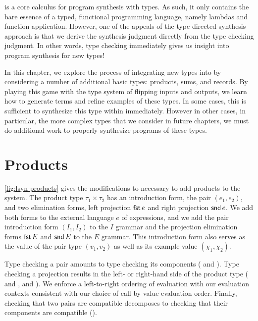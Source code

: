 \lsyn{} is a core calculus for program synthesis with types.
As such, it only contains the bare essence of a typed, functional programming language, namely lambdas and function application.
However, one of the appeals of the type-directed synthesis approach is that we derive the synthesis judgment directly from the type checking judgment.
In other words, type checking immediately gives us insight into program synthesis for new types!

In this chapter, we explore the process of integrating new types into \lsyn{} by considering a number of additional basic types: products, sums, and records.
By playing this game with the type system of flipping inputs and outputs, we learn how to generate terms and refine examples of these types.
In some cases, this is sufficient to synthesize this type within \lsyn{} immediately.
However in other cases, in particular, the more complex types that we consider in future chapters, we must do additional work to properly synthesize programs of these types.

\section{Products}



\autoref{fig:lsyn-products} gives the modifications to \lsyn{} necessary to add products to the system.
The product type $τ_1 × τ_2$ has an introduction form, the pair $(e_1, e_2)$, and two elimination forms, left projection $\mathsf{fst}\,e$ and right projection $\mathsf{snd}\,e$.
We add both forms to the external language $e$ of expressions, and we add the pair introduction form $(I_1, I_2)$ to the $I$ grammar and the projection elimination forms $\mathsf{fst}\,E$ and $\mathsf{snd}\,E$ to the $E$ grammar.
This introduction form also serves as the value of the pair type $(v_1, v_2)$ as well as its example value $(χ_1, χ_2)$.

Type checking a pair amounts to type checking its components ( and ).
Type checking a projection results in the left- or right-hand side of the product type ( and ,  and ).
We enforce a left-to-right ordering of evaluation with our evaluation contexts consistent with our choice of call-by-value evaluation order.
Finally, checking that two pairs are compatible decomposes to checking that their components are compatible ().

